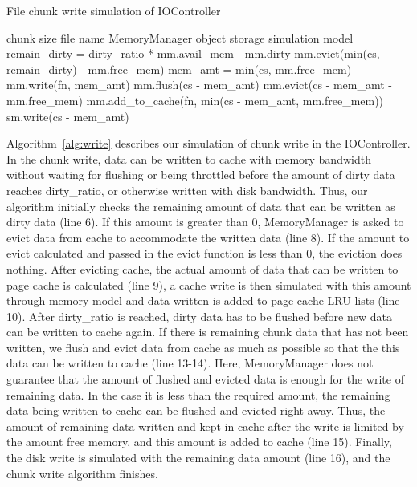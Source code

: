 \documentclass[conference]{IEEEtran}
\newcommand{\Desc}[2]{\State \makebox[2em][l]{#1}#2}
\begin{document}
			\begin{algorithm}\caption{File chunk write simulation of IOController}
			\label{alg:write}
				\small
				\begin{algorithmic}[1]
					\Input
        				\Desc{cs}{chunk size}
        				\Desc{fn}{file name}
						\Desc{mm}{MemoryManager object}
						\Desc{sm}{storage simulation model}
   					\EndInput
					\State remain\_dirty = dirty\_ratio * mm.avail\_mem - mm.dirty
					 
    					\State mm.evict(min(cs, remain\_dirty) - mm.free\_mem)
    					\State mem\_amt = min(cs, mm.free\_mem)
    					\State mm.write(fn, mem\_amt) 
    				\EndIf
					  
						\State mm.flush(cs - mem\_amt)  
						\State mm.evict(cs - mem\_amt  - mm.free\_mem) 
						\State mm.add\_to\_cache(fn, min(cs - mem\_amt, mm.free\_mem))
						\State sm.write(cs - mem\_amt)
					\EndIf
					
				\end{algorithmic}
			\end{algorithm}

			Algorithm~\ref{alg:write} describes our simulation of chunk write in 
			the IOController. 
			In the chunk write, data can be written to cache with memory bandwidth 
			without waiting for flushing or being throttled before the amount of 
			dirty data reaches dirty\_ratio, or otherwise written with disk bandwidth.
			Thus, our algorithm initially checks the remaining amount of data that 
			can be written as dirty data (line 6).
			If this amount is greater than 0, MemoryManager is asked to evict 
			data from cache to accommodate the written data (line 8). 
			If the amount to evict calculated and passed in the evict function is less than 0, 
			the eviction does nothing.
			After evicting cache, the actual amount of data that can be written to 
			page cache is calculated (line 9), a cache write is then simulated 
			with this amount through memory model and data written is added to 
			page cache LRU lists (line 10).
			After dirty\_ratio is reached, dirty data has to be flushed before new data 
			can be written to cache again. 
			If there is remaining chunk data that has not been written, we flush and 
			evict data from cache as much as possible so that the this data can be 
			written to cache (line 13-14). 
			Here, MemoryManager does not guarantee that the amount of flushed 
			and evicted data is enough for the write of remaining data. 
			In the case it is less than the required amount, the remaining data 
			being written to cache can be flushed and evicted right away. 
			Thus, the amount of remaining data written and kept in cache 
			after the write is limited by the amount free memory, and this amount 
			is added to cache (line 15). 
			Finally, the disk write is simulated with the remaining data amount (line 16), 
			and the chunk write algorithm finishes.
			
\end{document}
